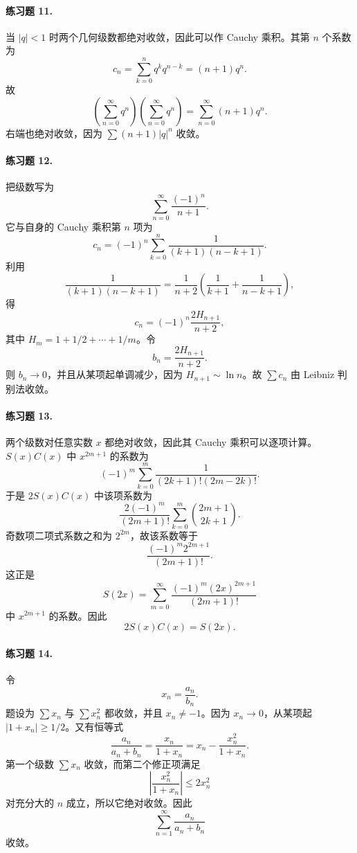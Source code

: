 \paragraph{练习题 11.}
\begin{xsolution}
当 $|q|<1$ 时两个几何级数都绝对收敛，因此可以作 Cauchy 乘积。其第 $n$ 个系数为
\[
 c_n=\sum_{k=0}^{n}q^kq^{n-k}=(n+1)q^n.
\]
故
\[
 \left(\sum_{n=0}^{\infty}q^n\right)
 \left(\sum_{n=0}^{\infty}q^n\right)
 =\sum_{n=0}^{\infty}(n+1)q^n.
\]
右端也绝对收敛，因为 $\sum(n+1)|q|^n$ 收敛。
\end{xsolution}

\paragraph{练习题 12.}
\begin{xsolution}
把级数写为
\[
 \sum_{n=0}^{\infty}\frac{(-1)^n}{n+1}.
\]
它与自身的 Cauchy 乘积第 $n$ 项为
\[
 c_n=(-1)^n\sum_{k=0}^{n}\frac1{(k+1)(n-k+1)}.
\]
利用
\[
 \frac1{(k+1)(n-k+1)}
 =\frac1{n+2}\left(\frac1{k+1}+\frac1{n-k+1}\right),
\]
得
\[
 c_n=(-1)^n\frac{2H_{n+1}}{n+2},
\]
其中 $H_m=1+1/2+\cdots+1/m$。令
\[
 b_n=\frac{2H_{n+1}}{n+2}.
\]
则 $b_n\to0$，并且从某项起单调减少，因为 $H_{n+1}\sim\ln n$。故 $\sum c_n$ 由 Leibniz 判别法收敛。
\end{xsolution}

\paragraph{练习题 13.}
\begin{xsolution}
两个级数对任意实数 $x$ 都绝对收敛，因此其 Cauchy 乘积可以逐项计算。$S(x)C(x)$ 中 $x^{2m+1}$ 的系数为
\[
 (-1)^m\sum_{k=0}^{m}\frac1{(2k+1)!(2m-2k)!}.
\]
于是 $2S(x)C(x)$ 中该项系数为
\[
 \frac{2(-1)^m}{(2m+1)!}
 \sum_{k=0}^{m}\binom{2m+1}{2k+1}.
\]
奇数项二项式系数之和为 $2^{2m}$，故该系数等于
\[
 \frac{(-1)^m2^{2m+1}}{(2m+1)!}.
\]
这正是
\[
 S(2x)=\sum_{m=0}^{\infty}\frac{(-1)^m(2x)^{2m+1}}{(2m+1)!}
\]
中 $x^{2m+1}$ 的系数。因此
\[
 \boxed{2S(x)C(x)=S(2x)}.
\]
\end{xsolution}

\paragraph{练习题 14.}
\begin{xsolution}
令
\[
 x_n=\frac{a_n}{b_n}.
\]
题设为 $\sum x_n$ 与 $\sum x_n^2$ 都收敛，并且 $x_n\neq-1$。因为 $x_n\to0$，从某项起 $|1+x_n|\geq1/2$。又有恒等式
\[
 \frac{a_n}{a_n+b_n}
 =\frac{x_n}{1+x_n}
 =x_n-\frac{x_n^2}{1+x_n}.
\]
第一个级数 $\sum x_n$ 收敛，而第二个修正项满足
\[
 \left|\frac{x_n^2}{1+x_n}\right|\leq2x_n^2
\]
对充分大的 $n$ 成立，所以它绝对收敛。因此
\[
 \sum_{n=1}^{\infty}\frac{a_n}{a_n+b_n}
\]
收敛。
\end{xsolution}

